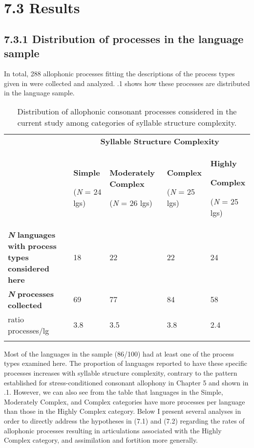 \section{7.3 Results}
\subsection{7.3.1 Distribution of processes in the language sample}

  In total, 288 allophonic processes fitting the descriptions of the process types given in  were collected and analyzed. .1 shows how these processes are distributed in the language sample. 

\begin{table}
\begin{tabularx}{\textwidth}{XXXXX}
\lsptoprule
 & \multicolumn{4}{c}{ \textbf{Syllable} \textbf{Structure} \textbf{Complexity}}\\
& { \textbf{Simple}}

 (\textit{N} = 24 lgs) & { \textbf{Moderately} \textbf{Complex}}

 (\textit{N} = 26 lgs) & { \textbf{Complex}}

 (\textit{N} = 25 lgs) & { \textbf{Highly} }

{ \textbf{Complex}}

 (\textit{N} = 25 lgs)\\
 \textbf{\textit{N} }\textbf{languages} \textbf{with} \textbf{process} \textbf{types} \textbf{considered} \textbf{here} & 18 & 22 & 22 & 24\\
 \textbf{\textit{N}} \textbf{processes} \textbf{collected} & 69 & 77 & 84 & 58\\
 ratio processes/lg & 3.8 & 3.5 & 3.8 & 2.4\\
\lspbottomrule
\end{tabularx}
\caption{\label{7.1}Distribution of allophonic consonant processes considered in the current study among categories of syllable structure complexity.}
\end{table}

Most of the languages in the sample (86/100) had at least one of the process types examined here. The proportion of languages reported to have these specific processes increases with syllable structure complexity, contrary to the pattern established for stress-conditioned consonant allophony in Chapter 5 and shown in .1. However, we can also see from the table that languages in the Simple, Moderately Complex, and Complex categories have more processes per language than those in the Highly Complex category. Below I present several analyses in order to directly address the hypotheses in (7.1) and (7.2) regarding the rates of allophonic processes resulting in articulations associated with the Highly Complex category, and assimilation and fortition more generally.

